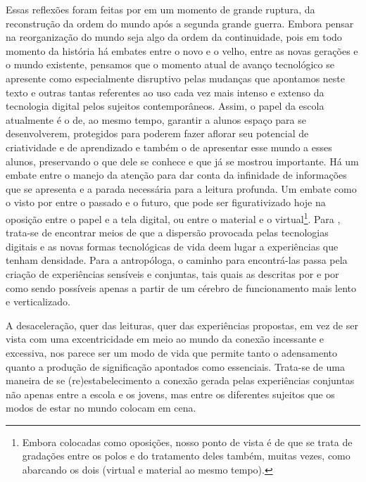 Essas reflexões foram feitas por \textcite{arendt2014} em um momento de grande ruptura, da reconstrução da ordem do mundo após a segunda grande guerra. Embora pensar na reorganização do mundo seja algo da ordem da continuidade, pois em todo momento da história há embates entre o novo e o velho, entre as novas gerações e o mundo existente, pensamos que o momento atual de avanço tecnológico se apresente como especialmente disruptivo pelas mudanças que apontamos neste texto e outras tantas referentes ao uso cada vez mais intenso e extenso da tecnologia digital pelos sujeitos contemporâneos. Assim, o papel da escola atualmente é o de, ao mesmo tempo, garantir a alunos espaço para se desenvolverem, protegidos para poderem fazer aflorar seu potencial de criatividade e de aprendizado e também o de apresentar esse mundo a esses alunos, preservando o que dele se conhece e que já se mostrou importante. Há um embate entre o manejo da atenção para dar conta da infinidade de informações que se apresenta e a parada necessária para a leitura profunda.  Um embate como o visto por \textcite{arendt2014} entre o passado e o futuro, que pode ser figurativizado hoje na oposição entre o papel e a tela digital, ou entre o material e o virtual\footnote{ Embora colocadas como oposições, nosso ponto de vista é de que se trata de gradações entre os polos e do tratamento deles também, muitas vezes, como abarcando os dois (virtual e material ao mesmo tempo).}. Para \textcite{sibilia2012}, trata-se de encontrar meios de que a dispersão provocada pelas tecnologias digitais e as novas formas tecnológicas de vida deem lugar a experiências que tenham densidade. Para a antropóloga, o caminho para encontrá-las passa pela criação de experiências sensíveis e conjuntas, tais quais as descritas por \textcite{carr2010} e por \textcite{wolf2019} como sendo possíveis apenas a partir de um cérebro de funcionamento mais lento e verticalizado. 

A desaceleração, quer das leituras, quer das experiências propostas, em vez de ser vista com uma excentricidade em meio ao mundo da conexão incessante e excessiva, nos parece ser um modo de vida que permite tanto o adensamento quanto a produção de significação apontados como essenciais. Trata-se de uma maneira de se (re)estabelecimento a conexão gerada pelas experiências conjuntas não apenas entre a escola e os jovens, mas entre os diferentes sujeitos que os modos de estar no mundo colocam em cena.